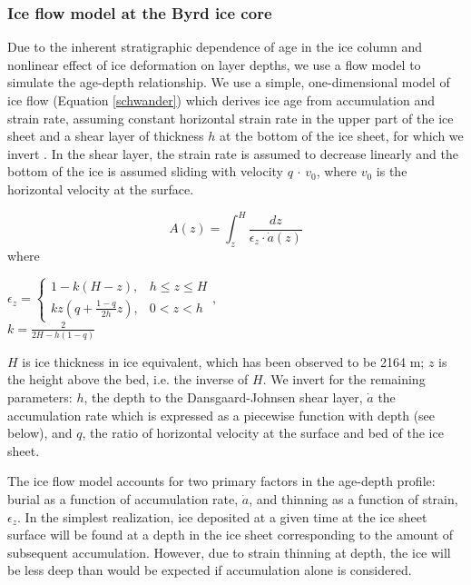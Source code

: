 \subsubsection{Ice flow model at the Byrd ice core}

Due to the inherent stratigraphic dependence of age in the ice column and nonlinear effect of ice deformation on layer depths, we use a flow model to simulate the age-depth relationship. We use a simple, one-dimensional model of ice flow (Equation \ref{schwander}) which derives ice age from accumulation and strain rate, assuming constant horizontal strain rate in the upper part of the ice sheet and a shear layer of thickness $h$ at the bottom of the ice sheet, for which we invert \citep{schwander2001}. In the shear layer, the strain rate is assumed to decrease linearly and the bottom of the ice is assumed sliding with velocity $q$ $\cdot$ $v_0$, where $v_0$ is the horizontal velocity at the surface.

\begin{equation}\label{schwander}
A(z) = \int_{z}^{H} \frac{dz}{\epsilon_z \cdot \dot{a}(z)}
\end{equation}
where
\begin{center}
$    \epsilon_z=
    \begin{cases}
                 1-k(H-z), & h \leq z \leq H \\
                  kz(q+\frac{1-q}{2h}z), & 0 < z < h
    \end{cases}, 
$
\\
$
k = \frac{2}{2H - h(1-q)}
$
\end{center}
$H$ is ice thickness in ice equivalent, which has been observed to be 2164 m;  $z$ is the height above the bed, i.e. the inverse of $H$. We invert for the remaining parameters: $h$, the depth to the Dansgaard-Johnsen shear layer, $\dot{a}$ the accumulation rate which is expressed as a piecewise function with depth (see below), and $q$, the ratio of horizontal velocity at the surface and bed of the ice sheet.

The ice flow model accounts for two primary factors in the age-depth profile: burial as a function of accumulation rate, $\dot{a}$, and thinning as a function of strain, $\epsilon_z$. In the simplest realization, ice deposited at a given time at the ice sheet surface will be found at a depth in the ice sheet corresponding to the amount of subsequent accumulation. However, due to strain thinning at depth, the ice will be less deep than would be expected if accumulation alone is considered. 


